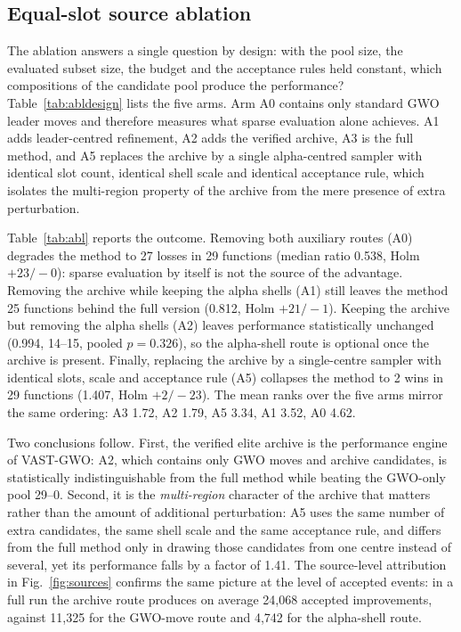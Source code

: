 \documentclass[11pt,a4paper]{article}
\newcommand{\method}{VAST-GWO}
\begin{document}
\subsection{Equal-slot source ablation}
The ablation answers a single question by design: with the pool size, the
evaluated subset size, the budget and the acceptance rules held constant, which
compositions of the candidate pool produce the performance? Table~\ref{tab:abldesign}
lists the five arms. Arm A0 contains only standard GWO leader moves and
therefore measures what sparse evaluation alone achieves. A1 adds
leader-centred refinement, A2 adds the verified archive, A3 is the full method,
and A5 replaces the archive by a single alpha-centred sampler with identical
slot count, identical shell scale and identical acceptance rule, which isolates
the multi-region property of the archive from the mere presence of extra
perturbation.

\begin{table}[t]
\centering
\small
\caption{Equal-slot source ablation. All arms use $M=100$, $K=10$,
100{,}000 true evaluations and identical acceptance rules; only the
composition of the pool differs.}
\label{tab:abldesign}
\resizebox{\linewidth}{!}{}
\end{table}

Table~\ref{tab:abl} reports the outcome. Removing both auxiliary routes (A0)
degrades the method to 27 losses in 29 functions (median ratio 0.538, Holm
$+23/-0$): sparse evaluation by itself is not the source of the advantage.
Removing the archive while keeping the alpha shells (A1) still leaves the
method 25 functions behind the full version (0.812, Holm $+21/-1$). Keeping
the archive but removing the alpha shells (A2) leaves performance
statistically unchanged (0.994, 14--15, pooled $p=0.326$), so the alpha-shell
route is optional once the archive is present. Finally, replacing the archive
by a single-centre sampler with identical slots, scale and acceptance rule
(A5) collapses the method to 2 wins in 29 functions (1.407, Holm $+2/-23$).
The mean ranks over the five arms mirror the same ordering: A3 1.72, A2 1.79,
A5 3.34, A1 3.52, A0 4.62.

Two conclusions follow. First, the verified elite archive is the performance
engine of \method: A2, which contains only GWO moves and archive candidates,
is statistically indistinguishable from the full method while beating the
GWO-only pool 29--0. Second, it is the \emph{multi-region} character of the
archive that matters rather than the amount of additional perturbation: A5
uses the same number of extra candidates, the same shell scale and the same
acceptance rule, and differs from the full method only in drawing those
candidates from one centre instead of several, yet its performance falls by a
factor of 1.41. The source-level attribution in Fig.~\ref{fig:sources}
confirms the same picture at the level of accepted events: in a full run the
archive route produces on average 24{,}068 accepted improvements, against
11{,}325 for the GWO-move route and 4{,}742 for the alpha-shell route.
\end{document}
